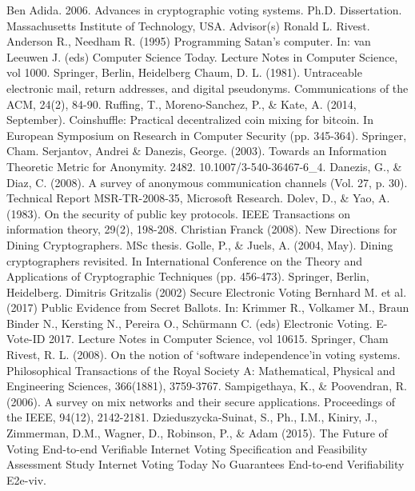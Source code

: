 \documentclass{article}
\begin{document}
\begin{thebibliography}{9}
  
 Ben Adida. 2006. Advances in cryptographic voting systems. Ph.D. Dissertation. Massachusetts Institute of Technology, USA. Advisor(s) Ronald L. Rivest.
 Anderson R., Needham R. (1995) Programming Satan's computer. In: van Leeuwen J. (eds) Computer Science Today. Lecture Notes in Computer Science, vol 1000. Springer, Berlin, Heidelberg
 Chaum, D. L. (1981). Untraceable electronic mail, return addresses, and digital pseudonyms. Communications of the ACM, 24(2), 84-90.
 Ruffing, T., Moreno-Sanchez, P., \& Kate, A. (2014, September). Coinshuffle: Practical decentralized coin mixing for bitcoin. In European Symposium on Research in Computer Security (pp. 345-364). Springer, Cham.
 Serjantov, Andrei \& Danezis, George. (2003). Towards an Information Theoretic Metric for Anonymity. 2482. 10.1007/3-540-36467-6\_4.
 Danezis, G., \& Diaz, C. (2008). A survey of anonymous communication channels (Vol. 27, p. 30). Technical Report MSR-TR-2008-35, Microsoft Research.
 Dolev, D., \& Yao, A. (1983). On the security of public key protocols. IEEE Transactions on information theory, 29(2), 198-208.
 Christian Franck (2008). New Directions for Dining Cryptographers. MSc thesis.
 Golle, P., \& Juels, A. (2004, May). Dining cryptographers revisited. In International Conference on the Theory and Applications of Cryptographic Techniques (pp. 456-473). Springer, Berlin, Heidelberg.
 Dimitris Gritzalis (2002) Secure Electronic Voting
 Bernhard M. et al. (2017) Public Evidence from Secret Ballots. In: Krimmer R., Volkamer M., Braun Binder N., Kersting N., Pereira O., Schürmann C. (eds) Electronic Voting. E-Vote-ID 2017. Lecture Notes in Computer Science, vol 10615. Springer, Cham 
 Rivest, R. L. (2008). On the notion of ‘software independence’in voting systems. Philosophical Transactions of the Royal Society A: Mathematical, Physical and Engineering Sciences, 366(1881), 3759-3767.
 Sampigethaya, K., \& Poovendran, R. (2006). A survey on mix networks and their secure applications. Proceedings of the IEEE, 94(12), 2142-2181.
 Dzieduszycka-Suinat, S., Ph., I.M., Kiniry, J., Zimmerman, D.M., Wagner, D., Robinson, P., \& Adam (2015). The Future of Voting End-to-end Verifiable Internet Voting Specification and Feasibility Assessment Study Internet Voting Today No Guarantees End-to-end Verifiability E2e-viv.

  
  
\end{thebibliography}
\end{document}
